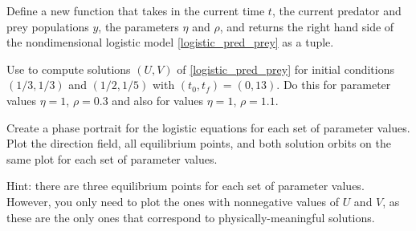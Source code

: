 \begin{problem}
Define a new function  that takes in the current time $t$, the current predator and prey populations $y$, the parameters $\eta$ and $\rho$, and returns the right hand side of the nondimensional logistic model \eqref{logistic_pred_prey} as a tuple.

Use  to compute solutions $(U,V)$ of \eqref{logistic_pred_prey}
for initial conditions $(1/3, 1/3)$ and $(1/2, 1/5)$ with $(t_0,t_f)=(0,13)$.
Do this for parameter values $\eta=1$, $\rho = 0.3$ and also for values $\eta=1$, $\rho = 1.1$.

Create a phase portrait for the logistic equations for each set of parameter values.
Plot the direction field, all equilibrium points, and both solution orbits on the same plot for each set of parameter values.

Hint: there are three equilibrium points for each set of parameter values.
However, you only need to plot the ones with nonnegative values of $U$ and $V$, as these are the only ones that correspond to physically-meaningful solutions.
\end{problem} 

